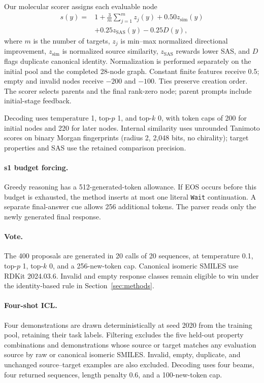 Our molecular scorer assigns each evaluable node
\begin{align}
 s(y)={}&1+\frac{3}{m}\sum_{j=1}^{m}z_j(y)
       +0.50z_{\mathrm{sim}}(y)\nonumber\\
       &+0.25z_{\mathrm{SAS}}(y)-0.25D(y),
\end{align}
where $m$ is the number of targets, $z_j$ is min--max normalized directional improvement, $z_{\mathrm{sim}}$ is normalized source similarity, $z_{\mathrm{SAS}}$ rewards lower SAS, and $D$ flags duplicate canonical identity. Normalization is performed separately on the initial pool and the completed 28-node graph. Constant finite features receive 0.5; empty and invalid nodes receive $-200$ and $-100$. Ties preserve creation order. The scorer selects parents and the final rank-zero node; parent prompts include initial-stage feedback.

Decoding uses temperature 1, top-$p$ 1, and top-$k$ 0, with token caps of 200 for initial nodes and 220 for later nodes. Internal similarity uses unrounded Tanimoto scores on binary Morgan fingerprints (radius 2, 2,048 bits, no chirality); target properties and SAS use the retained comparison precision.

\paragraph{s1 budget forcing.}
Greedy reasoning has a 512-generated-token allowance. If EOS occurs before this budget is exhausted, the method inserts at most one literal \texttt{Wait} continuation. A separate final-answer cue allows 256 additional tokens. The parser reads only the newly generated final response.

\paragraph{Vote.}
The 400 proposals are generated in 20 calls of 20 sequences, at temperature 0.1, top-$p$ 1, top-$k$ 0, and a 256-new-token cap. Canonical isomeric SMILES use RDKit 2024.03.6. Invalid and empty response classes remain eligible to win under the identity-based rule in Section~\ref{sec:methods}.

\paragraph{Four-shot ICL.}
Four demonstrations are drawn deterministically at seed 2020 from the training pool, retaining their task labels. Filtering excludes the five held-out property combinations and demonstrations whose source or target matches any evaluation source by raw or canonical isomeric SMILES. Invalid, empty, duplicate, and unchanged source--target examples are also excluded. Decoding uses four beams, four returned sequences, length penalty 0.6, and a 100-new-token cap.

